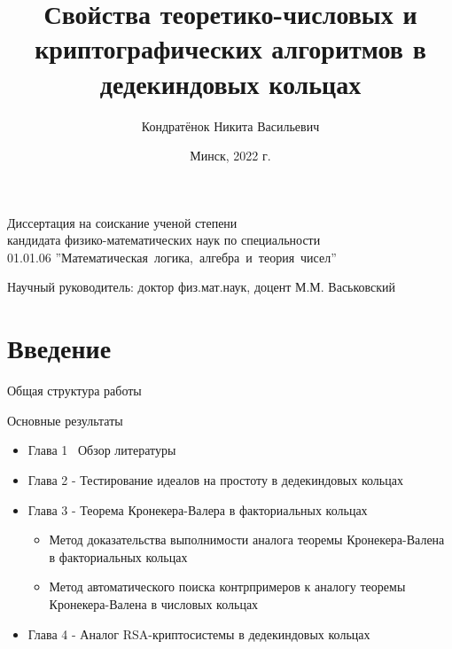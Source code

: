\documentclass[8pt, xcolor=x11names]{beamer}
\author[Кондратёнок Н.В.]{Кондратёнок Никита Васильевич}
\title[]{Свойства теоретико-числовых и криптографических алгоритмов в дедекиндовых кольцах}
\date{Минск, 2022 г.}
\begin{document}
\begin{frame}
    \titlepage

    \begin{center}
        Диссертация на соискание ученой степени\\
        кандидата физико-математических наук по специальности\\
        01.01.06 ''Математическая~логика,~алгебра~и~теория~чисел''
    \end{center}

    \begin{center}
        Научный руководитель: доктор физ.мат.наук, доцент М.М. Васьковский
    \end{center}    
\end{frame}

\section{Введение}

\begin{frame}{Общая структура работы}
    \begin{block}{Основные результаты}
        \begin{itemize}
            \item Глава 1 \textendash\ Обзор литературы
            
            \item Глава 2 - Тестирование идеалов на простоту в дедекиндовых кольцах

            \item Глава 3 - Теорема Кронекера-Валера в факториальных кольцах
            \begin{itemize}
                \item Метод доказательства выполнимости аналога теоремы Кронекера-Валена в факториальных кольцах

                \item Метод автоматического поиска контрпримеров к аналогу теоремы Кронекера-Валена в числовых кольцах
            \end{itemize}
            
            \item Глава 4 - Аналог RSA-криптосистемы в дедекиндовых кольцах
        \end{itemize}
    \end{block}
\end{frame}
\end{document}
